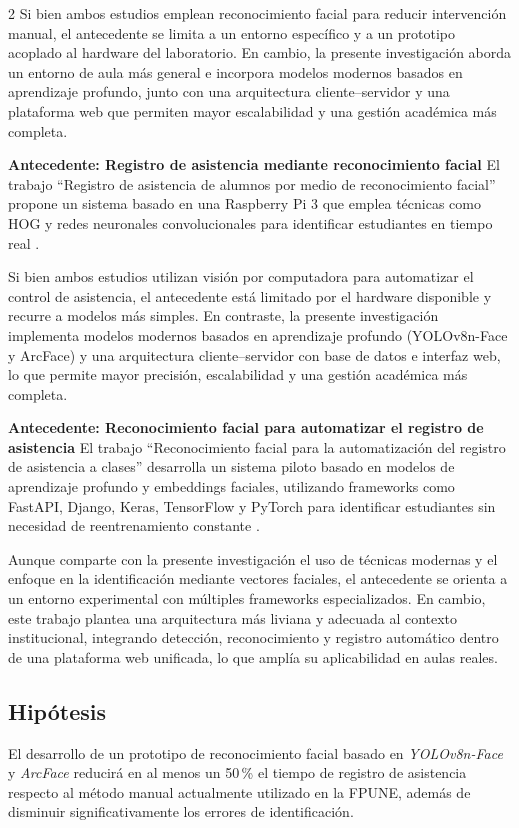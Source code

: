 \documentclass[10pt,a4paper]{article}
\begin{document}
\begin{multicols}{2}
Si bien ambos estudios emplean reconocimiento facial para reducir intervención manual, el antecedente se limita a un entorno específico y a un prototipo acoplado al hardware del laboratorio. En cambio, la presente investigación aborda un entorno de aula más general e incorpora modelos modernos basados en aprendizaje profundo, junto con una arquitectura cliente–servidor y una plataforma web que permiten mayor escalabilidad y una gestión académica más completa.

\textbf{Antecedente: Registro de asistencia mediante reconocimiento facial} El trabajo “Registro de asistencia de alumnos por medio de reconocimiento facial” propone un sistema basado en una Raspberry Pi 3 que emplea técnicas como HOG y redes neuronales convolucionales para identificar estudiantes en tiempo real \cite{registroAsistenciaUTA}.

Si bien ambos estudios utilizan visión por computadora para automatizar el control de asistencia, el antecedente está limitado por el hardware disponible y recurre a modelos más simples. En contraste, la presente investigación implementa modelos modernos basados en aprendizaje profundo (YOLOv8n-Face y ArcFace) y una arquitectura cliente–servidor con base de datos e interfaz web, lo que permite mayor precisión, escalabilidad y una gestión académica más completa.

\textbf{Antecedente: Reconocimiento facial para automatizar el registro de asistencia} El trabajo “Reconocimiento facial para la automatización del registro de asistencia a clases” desarrolla un sistema piloto basado en modelos de aprendizaje profundo y embeddings faciales, utilizando frameworks como FastAPI, Django, Keras, TensorFlow y PyTorch para identificar estudiantes sin necesidad de reentrenamiento constante \cite{automatizacionAsistencia}.

Aunque comparte con la presente investigación el uso de técnicas modernas y el enfoque en la identificación mediante vectores faciales, el antecedente se orienta a un entorno experimental con múltiples frameworks especializados. En cambio, este trabajo plantea una arquitectura más liviana y adecuada al contexto institucional, integrando detección, reconocimiento y registro automático dentro de una plataforma web unificada, lo que amplía su aplicabilidad en aulas reales.


\subsection{Hipótesis}
El desarrollo de un prototipo de reconocimiento facial basado en \textit{YOLOv8n-Face} y \textit{ArcFace} reducirá en al menos un 50\,\% el tiempo de registro de asistencia respecto al método manual actualmente utilizado en la FPUNE, además de disminuir significativamente los errores de identificación.


\end{multicols}
\end{document}
